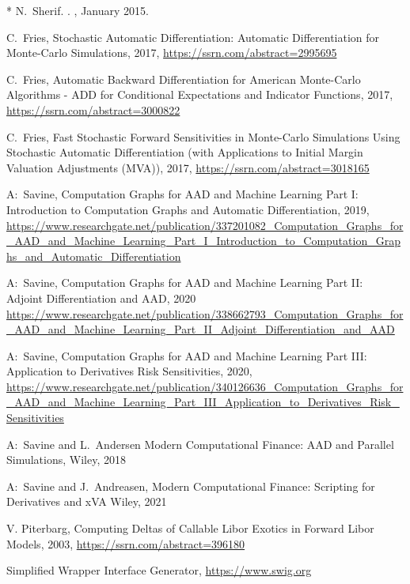 \documentclass[12pt, a4paper]{report}
\begin{document}
\begin{thebibliography}{*}
N.~Sherif.
.
, January 2015.

  C.~Fries, Stochastic Automatic Differentiation: Automatic Differentiation for Monte-Carlo Simulations, 2017, \url{https://ssrn.com/abstract=2995695}

  C.~Fries, Automatic Backward Differentiation for American Monte-Carlo Algorithms - ADD for Conditional Expectations and Indicator Functions, 2017, \url{https://ssrn.com/abstract=3000822}

  C.~Fries, Fast Stochastic Forward Sensitivities in Monte-Carlo Simulations Using Stochastic Automatic Differentiation (with Applications to Initial Margin Valuation Adjustments (MVA)), 2017, \url{https://ssrn.com/abstract=3018165}

 A:~Savine,
  Computation Graphs for AAD and Machine Learning Part I: \\
  Introduction to Computation Graphs and Automatic Differentiation, 2019,\\
  \url{https://www.researchgate.net/publication/337201082_Computation_Graphs_for_AAD_and_Machine_Learning_Part_I_Introduction_to_Computation_Graphs_and_Automatic_Differentiation}

 A:~Savine,
  Computation Graphs for AAD and Machine Learning Part II: \\
  Adjoint Differentiation and AAD, 2020\\
  \url{https://www.researchgate.net/publication/338662793_Computation_Graphs_for_AAD_and_Machine_Learning_Part_II_Adjoint_Differentiation_and_AAD}

 A:~Savine,
  Computation Graphs for AAD and Machine Learning Part III: \\
  Application to Derivatives Risk Sensitivities, 2020, \\
  \url{https://www.researchgate.net/publication/340126636_Computation_Graphs_for_AAD_and_Machine_Learning_Part_III_Application_to_Derivatives_Risk_Sensitivities}

 A:~Savine and L.~Andersen
  Modern Computational Finance: AAD and Parallel Simulations,
  Wiley, 2018

 A:~Savine and J.~Andreasen,
  Modern Computational Finance: Scripting for Derivatives and xVA
  Wiley, 2021

 V. Piterbarg, Computing Deltas of Callable Libor Exotics in Forward
  Libor Models, 2003, \url{https://ssrn.com/abstract=396180}

 Simplified Wrapper Interface Generator, \url{https://www.swig.org}
  
\end{thebibliography}
\end{document}
